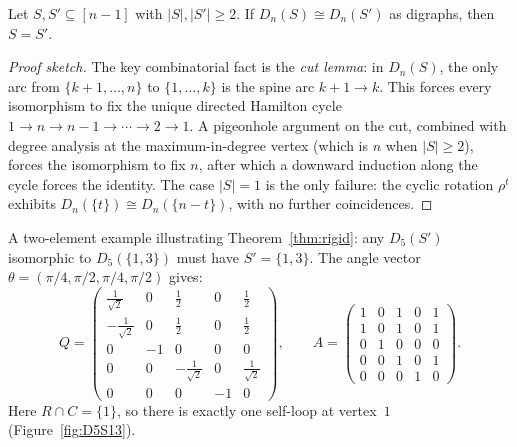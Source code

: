\begin{theorem}[Rigidity]\label{thm:rigid}
Let $S, S' \subseteq [n-1]$ with $|S|, |S'| \ge 2$. If $D_n(S) \cong D_n(S')$
as digraphs, then $S = S'$.
\end{theorem}

\begin{proof}[Proof sketch]
The key combinatorial fact is the \emph{cut lemma}: in $D_n(S)$, the only
arc from $\{k{+}1, \dots, n\}$ to $\{1, \dots, k\}$ is the spine arc
$k{+}1 \to k$. This forces every isomorphism to fix the unique directed
Hamilton cycle $1 \to n \to n{-}1 \to \cdots \to 2 \to 1$. A pigeonhole
argument on the cut, combined with degree analysis at the
maximum-in-degree vertex (which is $n$ when $|S| \ge 2$), forces the
isomorphism to fix $n$, after which a downward induction along the cycle
forces the identity. The case $|S| = 1$ is the only failure: the cyclic
rotation $\rho^t$ exhibits $D_n(\{t\}) \cong D_n(\{n - t\})$, with no
further coincidences.
\end{proof}

\begin{example}[$n = 5$, $S = \{1, 3\}$]\label{ex:D5S13}
A two-element example illustrating Theorem~\ref{thm:rigid}: any
$D_5(S')$ isomorphic to $D_5(\{1,3\})$ must have $S' = \{1, 3\}$. The
angle vector $\theta = (\pi/4, \pi/2, \pi/4, \pi/2)$ gives:
\[
Q = \begin{pmatrix}
\tfrac{1}{\sqrt{2}} & 0 & \tfrac{1}{2} & 0 & \tfrac{1}{2} \\
-\tfrac{1}{\sqrt{2}} & 0 & \tfrac{1}{2} & 0 & \tfrac{1}{2} \\
0 & -1 & 0 & 0 & 0 \\
0 & 0 & -\tfrac{1}{\sqrt{2}} & 0 & \tfrac{1}{\sqrt{2}} \\
0 & 0 & 0 & -1 & 0
\end{pmatrix},
\qquad
A = \begin{pmatrix}
1 & 0 & 1 & 0 & 1 \\
1 & 0 & 1 & 0 & 1 \\
0 & 1 & 0 & 0 & 0 \\
0 & 0 & 1 & 0 & 1 \\
0 & 0 & 0 & 1 & 0
\end{pmatrix}.
\]
Here $R \cap C = \{1\}$, so there is exactly one self-loop at vertex~$1$
(Figure~\ref{fig:D5S13}).
\end{example}

